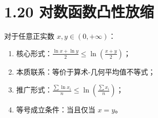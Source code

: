 \documentclass{article}
\begin{document}
\section*{1.20 对数函数凸性放缩}
对于任意正实数 \( x,y \in (0,+\infty) \)：
\begin{enumerate}
    \item 核心形式：\( \frac{\ln x+\ln y}{2} \leq \ln\!\left(\frac{x+y}{2}\right) \)；
    \item 本质联系：等价于算术-几何平均值不等式；
    \item 推广形式：\( \frac{\sum \ln x_i}{n} \leq \ln\!\left(\frac{\sum x_i}{n}\right) \)；
    \item 等号成立条件：当且仅当 \( x=y \)。
\end{enumerate}
\end{document}

